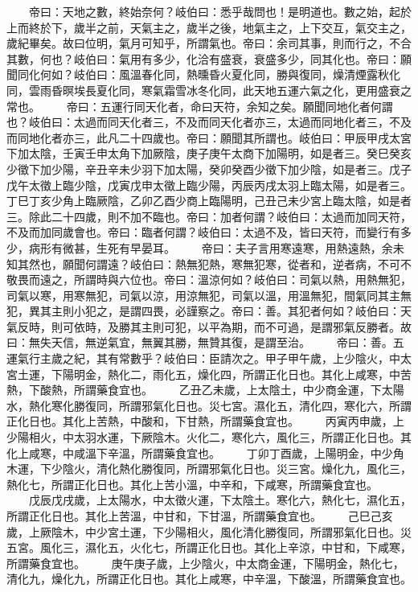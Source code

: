　　帝曰：天地之數，終始奈何？岐伯曰：悉乎哉問也！是明道也。數之始，起於上而終於下，歲半之前，天氣主之，歲半之後，地氣主之，上下交互，氣交主之，歲紀畢矣。故曰位明，氣月可知乎，所謂氣也。帝曰：余司其事，則而行之，不合其數，何也？岐伯曰：氣用有多少，化洽有盛衰，衰盛多少，同其化也。帝曰：願聞同化何如？岐伯曰：風溫春化同，熱曛昏火夏化同，勝與復同，燥清煙露秋化同，雲雨昏暝埃長夏化同，寒氣霜雪冰冬化同，此天地五運六氣之化，更用盛衰之常也。
　　帝曰：五運行同天化者，命曰天符，余知之矣。願聞同地化者何謂也？岐伯曰：太過而同天化者三，不及而同天化者亦三，太過而同地化者三，不及而同地化者亦三，此凡二十四歲也。帝曰：願聞其所謂也。岐伯曰：甲辰甲戌太宮下加太陰，壬寅壬申太角下加厥陰，庚子庚午太商下加陽明，如是者三。癸巳癸亥少徵下加少陽，辛丑辛未少羽下加太陽，癸卯癸酉少徵下加少陰，如是者三。戊子戊午太徵上臨少陰，戊寅戊申太徵上臨少陽，丙辰丙戌太羽上臨太陽，如是者三。丁巳丁亥少角上臨厥陰，乙卯乙酉少商上臨陽明，己丑己未少宮上臨太陰，如是者三。除此二十四歲，則不加不臨也。帝曰：加者何謂？岐伯曰：太過而加同天符，不及而加同歲會也。帝曰：臨者何謂？岐伯曰：太過不及，皆曰天符，而變行有多少，病形有微甚，生死有早晏耳。
　　帝曰：夫子言用寒遠寒，用熱遠熱，余未知其然也，願聞何謂遠？岐伯曰：熱無犯熱，寒無犯寒，從者和，逆者病，不可不敬畏而遠之，所謂時與六位也。帝曰：溫涼何如？岐伯曰：司氣以熱，用熱無犯，司氣以寒，用寒無犯，司氣以涼，用涼無犯，司氣以溫，用溫無犯，間氣同其主無犯，異其主則小犯之，是謂四畏，必謹察之。帝曰：善。其犯者何如？岐伯曰：天氣反時，則可依時，及勝其主則可犯，以平為期，而不可過，是謂邪氣反勝者。故曰：無失天信，無逆氣宜，無翼其勝，無贊其復，是謂至治。
　　帝曰：善。五運氣行主歲之紀，其有常數乎？岐伯曰：臣請次之。甲子甲午歲，上少陰火，中太宮土運，下陽明金，熱化二，雨化五，燥化四，所謂正化日也。其化上咸寒，中苦熱，下酸熱，所謂藥食宜也。
　　乙丑乙未歲，上太陰土，中少商金運，下太陽水，熱化寒化勝復同，所謂邪氣化日也。災七宮。濕化五，清化四，寒化六，所謂正化日也。其化上苦熱，中酸和，下甘熱，所謂藥食宜也。
　　丙寅丙申歲，上少陽相火，中太羽水運，下厥陰木。火化二，寒化六，風化三，所謂正化日也。其化上咸寒，中咸溫下辛溫，所謂藥食宜也。
　　丁卯丁酉歲，上陽明金，中少角木運，下少陰火，清化熱化勝復同，所謂邪氣化日也。災三宮。燥化九，風化三，熱化七，所謂正化日也。其化上苦小溫，中辛和，下咸寒，所謂藥食宜也。
　　戊辰戊戌歲，上太陽水，中太徵火運，下太陰土。寒化六，熱化七，濕化五，所謂正化日也。其化上苦溫，中甘和，下甘溫，所謂藥食宜也。
　　己巳己亥歲，上厥陰木，中少宮土運，下少陽相火，風化清化勝復同，所謂邪氣化日也。災五宮。風化三，濕化五，火化七，所謂正化日也。其化上辛涼，中甘和，下咸寒，所謂藥食宜也。
　　庚午庚子歲，上少陰火，中太商金運，下陽明金，熱化七，清化九，燥化九，所謂正化日也。其化上咸寒，中辛溫，下酸溫，所謂藥食宜也。
